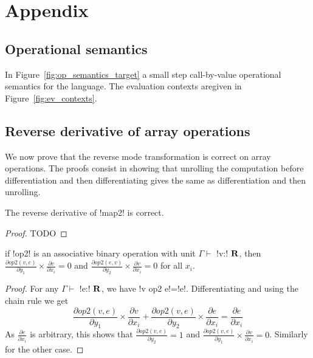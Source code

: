\section{Appendix}

 \subsection{Operational semantics}

In Figure~\ref{fig:op_semantics_target} a small step call-by-value operational semantics for the language. 
The evaluation contexts aregiven in Figure~\ref{fig:ev_contexts}. 





 \subsection{Reverse derivative of array operations}

We now prove that the reverse mode transformation is correct on array operations. 
The proofs consist in showing that unrolling the computation before differentiation 
and then differentiating gives the same as differentiation and then unrolling. 

 \begin{proposition}
    The reverse derivative of !map2! is correct.
\end{proposition}

\begin{proof}
    TODO
\end{proof}

\begin{lemma}
    if !op2! is an associative binary operation with unit $\Gamma \vdash$ !v:! $\mathbf{R}$, then 
    $\frac{\partial op2(v,e)}{\partial y_1}\times\frac{\partial v}{\partial x_i}=0$ 
    and $\frac{\partial op2(e,v)}{\partial y_2}\times\frac{\partial v}{\partial x_i}=0$ for all $x_i$.
\end{lemma}

\begin{proof}
    For any $\Gamma \vdash$ !e:! $\mathbf{R}$, we have !v op2 e!=!e!.
    Differentiating and using the chain rule we get 
    $$\frac{\partial op2(v,e)}{\partial y_1}\times\frac{\partial v}{\partial x_i}
    +\frac{\partial op2(v,e)}{\partial y_2}\times\frac{\partial e}{\partial x_i}
    = \frac{\partial e}{\partial x_i}$$
As $\frac{\partial e}{\partial x_i}$ is arbitrary, 
this shows that $\frac{\partial op2(v,e)}{\partial y_2}=1$ and $\frac{\partial op2(v,e)}{\partial y_1}\times\frac{\partial v}{\partial x_i}=0$.
Similarly for the other case.
\end{proof}


